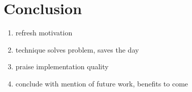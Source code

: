 \section{Conclusion}
\begin{enumerate}
\item refresh motivation
\item technique solves problem, saves the day
\item praise implementation quality
\item conclude with mention of future work, benefits to come
\end{enumerate}
